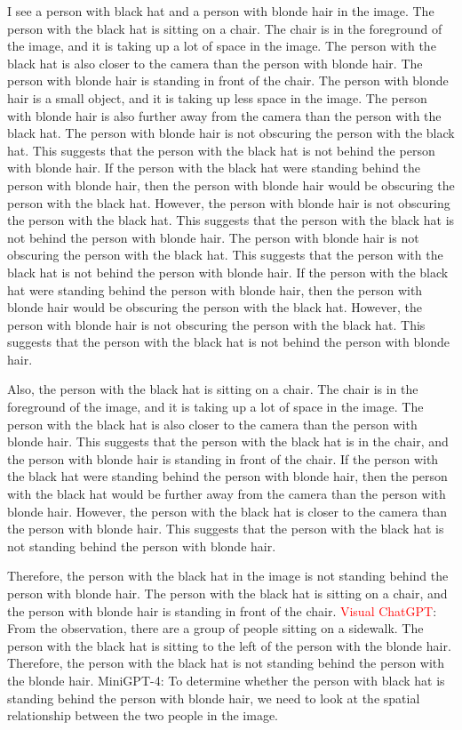 \begin{enumerate}
    I see a person with black hat and a person with blonde hair in the image.
    The person with the black hat is sitting on a chair. The chair is in the foreground of the image, and it is taking up a lot of space in the image. The person with the black hat is also closer to the camera than the person with blonde hair.
    The person with blonde hair is standing in front of the chair. The person with blonde hair is a small object, and it is taking up less space in the image. The person with blonde hair is also further away from the camera than the person with the black hat.
    The person with blonde hair is not obscuring the person with the black hat. This suggests that the person with the black hat is not behind the person with blonde hair.
    If the person with the black hat were standing behind the person with blonde hair, then the person with blonde hair would be obscuring the person with the black hat. However, the person with blonde hair is not obscuring the person with the black hat. This suggests that the person with the black hat is not behind the person with blonde hair.
    The person with blonde hair is not obscuring the person with the black hat. This suggests that the person with the black hat is not behind the person with blonde hair. If the person with the black hat were standing behind the person with blonde hair, then the person with blonde hair would be obscuring the person with the black hat. However, the person with blonde hair is not obscuring the person with the black hat. This suggests that the person with the black hat is not behind the person with blonde hair.
    
    Also, the person with the black hat is sitting on a chair. The chair is in the foreground of the image, and it is taking up a lot of space in the image. The person with the black hat is also closer to the camera than the person with blonde hair. This suggests that the person with the black hat is in the chair, and the person with blonde hair is standing in front of the chair. If the person with the black hat were standing behind the person with blonde hair, then the person with the black hat would be further away from the camera than the person with blonde hair. However, the person with the black hat is closer to the camera than the person with blonde hair. This suggests that the person with the black hat is not standing behind the person with blonde hair.
    
    Therefore, the person with the black hat in the image is not standing behind the person with blonde hair. The person with the black hat is sitting on a chair, and the person with blonde hair is standing in front of the chair.
    \subitem \textcolor{red}{Visual ChatGPT}: From the observation, there are a group of people sitting on a sidewalk. The person with the black hat is sitting to the left of the person with the blonde hair. Therefore, the person with the black hat is not standing behind the person with the blonde hair.
    \subitem MiniGPT-4: To determine whether the person with black hat is standing behind the person with blonde hair, we need to look at the spatial relationship between the two people in the image.


\end{enumerate}
